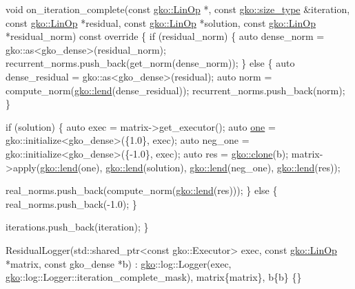 \begin{DoxyCodeInclude}
    \textcolor{keywordtype}{void} on\_iteration\_complete(\textcolor{keyword}{const} \hyperlink{classgko_1_1LinOp}{gko::LinOp} *,
                               \textcolor{keyword}{const} \hyperlink{namespacegko_a6e5c95df0ae4e47aab2f604a22d98ee7}{gko::size\_type} &iteration,
                               \textcolor{keyword}{const} \hyperlink{classgko_1_1LinOp}{gko::LinOp} *residual,
                               \textcolor{keyword}{const} \hyperlink{classgko_1_1LinOp}{gko::LinOp} *solution,
                               \textcolor{keyword}{const} \hyperlink{classgko_1_1LinOp}{gko::LinOp} *residual\_norm)\textcolor{keyword}{ const override}
\textcolor{keyword}{    }\{
        \textcolor{keywordflow}{if} (residual\_norm) \{
            \textcolor{keyword}{auto} dense\_norm = gko::as<gko\_dense>(residual\_norm);
            recurrent\_norms.push\_back(get\_norm(dense\_norm));
        \} \textcolor{keywordflow}{else} \{
            \textcolor{keyword}{auto} dense\_residual = gko::as<gko\_dense>(residual);
            \textcolor{keyword}{auto} norm = compute\_norm(\hyperlink{namespacegko_aa8cb4876b72e5e1036ea9575443c439b}{gko::lend}(dense\_residual));
            recurrent\_norms.push\_back(norm);
        \}

        \textcolor{keywordflow}{if} (solution) \{
            \textcolor{keyword}{auto} exec = matrix->get\_executor();
            \textcolor{keyword}{auto} \hyperlink{namespacegko_a0059e27f8f4bc348ff65c1e60caf47c8}{one} = gko::initialize<gko\_dense>(\{1.0\}, exec);
            \textcolor{keyword}{auto} neg\_one = gko::initialize<gko\_dense>(\{-1.0\}, exec);
            \textcolor{keyword}{auto} res = \hyperlink{namespacegko_a1beb80750459e4201aa9d882d2d074c3}{gko::clone}(b);
            matrix->apply(\hyperlink{namespacegko_aa8cb4876b72e5e1036ea9575443c439b}{gko::lend}(one), \hyperlink{namespacegko_aa8cb4876b72e5e1036ea9575443c439b}{gko::lend}(solution),
                          \hyperlink{namespacegko_aa8cb4876b72e5e1036ea9575443c439b}{gko::lend}(neg\_one), \hyperlink{namespacegko_aa8cb4876b72e5e1036ea9575443c439b}{gko::lend}(res));

            real\_norms.push\_back(compute\_norm(\hyperlink{namespacegko_aa8cb4876b72e5e1036ea9575443c439b}{gko::lend}(res)));
        \} \textcolor{keywordflow}{else} \{
            real\_norms.push\_back(-1.0);
        \}

        iterations.push\_back(iteration);
    \}

    ResidualLogger(std::shared\_ptr<const gko::Executor> exec,
                   \textcolor{keyword}{const} \hyperlink{classgko_1_1LinOp}{gko::LinOp} *matrix, \textcolor{keyword}{const} gko\_dense *b)
        : \hyperlink{namespacegko}{gko}::log::Logger(exec, \hyperlink{namespacegko}{gko}::log::Logger::iteration\_complete\_mask),
          matrix\{matrix\},
          b\{b\}
    \{\}


\end{DoxyCodeInclude}
